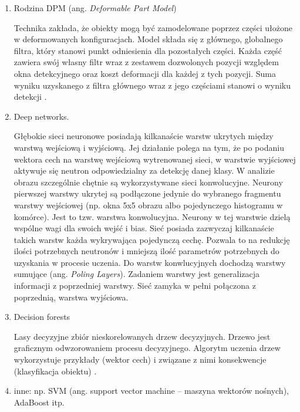 \begin{enumerate}
\item Rodzina DPM (ang. \textit{Deformable Part Model})

Technika zakłada, że obiekty mogą być zamodelowane poprzez części ułożone w deformowanych konfiguracjach. Model składa się z głównego, globalnego filtra, który stanowi punkt odniesienia dla pozostałych części. Każda część zawiera swój własny filtr wraz z zestawem dozwolonych pozycji względem okna detekcyjnego oraz koszt deformacji dla każdej z tych pozycji. Suma wyniku uzyskanego z filtra głównego wraz z jego częściami stanowi o wyniku detekcji \cite{felzenszwalb2008discriminatively}.

\item Deep networks.

Głębokie sieci neuronowe posiadają kilkanaście warstw ukrytych między warstwą wejściową i wyjściową. Jej działanie polega na tym, że po podaniu wektora cech na warstwę wejściową wytrenowanej sieci, w warstwie wyjściowej aktywuje się neutron odpowiedzialny za detekcję danej klasy. W analizie obrazu szczególnie chętnie są wykorzystywane sieci konwolucyjne. Neurony pierwszej warstwy ukrytej są podłączone jedynie do wybranego fragmentu warstwy wejściowej (np. okna 5x5 obrazu albo pojedynczego histogramu w komórce). Jest to tzw. warstwa konwolucyjna. Neurony w tej warstwie dzielą wspólne wagi dla swoich wejść i bias. Sieć posiada zazwyczaj kilkanaście takich warstw każda wykrywająca pojedynczą cechę. Pozwala to na redukcję ilości potrzebnych neutronów i mniejszą ilość parametrów potrzebnych do uzyskania w procesie uczenia. Do warstw konwlucyjnych dochodzą warstwy sumujące (ang. \textit{Poling Layers}). Zadaniem warstwy jest generalizacja informacji z poprzedniej warstwy. Sieć zamyka w pełni połączona z poprzednią, warstwa wyjściowa.

\item Decision forests

Lasy decyzyjne zbiór nieskorelowanych drzew decyzyjnych. Drzewo jest graficznym odwzorowaniem procesu decyzyjnego. Algorytm uczenia drzew wykorzystuje przykłady (wektor cech) i związane z nimi konsekwencje (klasyfikacja obiektu) .

\item inne: np. SVM (ang. support vector machine – maszyna wektorów nośnych), AdaBoost itp.


\end{enumerate}



